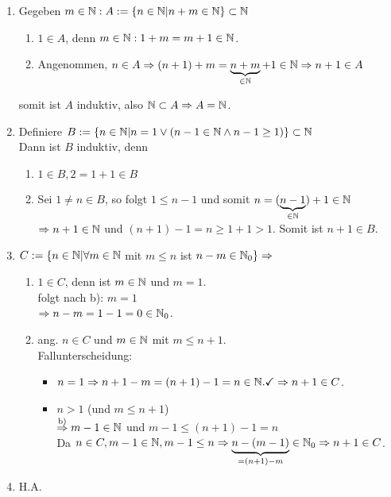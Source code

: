 \documentclass[../ana1.tex]{subfiles}
\begin{document}
\begin{bew}\leavevmode
	\begin{enumerate}
		\item Gegeben \(m\in\mathbb{N}: A :=\{n\in \mathbb{N} | n+m\in \mathbb{N} \} \subset \mathbb{N} \) \\
			\begin{enumerate}
				\item \(1\in A\), denn \(m\in\mathbb{N}: 1+m = m+1\in\mathbb{N} \).
				\item Angenommen, \(n\in A \Rightarrow (n+1) + m = \underbrace{n+m}_{\in\mathbb{N}} + 1 \in\mathbb{N} \\
					\Rightarrow n+1\in A\)
			\end{enumerate} somit ist \(A\) induktiv, also \( \mathbb{N}\subset A \Rightarrow A = \mathbb{N} \).
		\item Definiere \(B:= \{n\in \mathbb{N} |n=1 \vee (n-1\in\mathbb{N}\wedge n-1\geq 1)\} \subset \mathbb{N} \) \\
			Dann ist \(B\) induktiv, denn
			\begin{enumerate}
				\item \(1\in B, 2=1+1\in B\)
				\item Sei \(1\neq n\in B\), so folgt \(1\leq n-1\) und somit \(n=(\underbrace{n-1}_{\in\mathbb{N}}) +1\in\mathbb{N} \) \\
					\( \Rightarrow n+1\in\mathbb{N} \) und \((n+1)-1=n\geq 1+1>1\).
					Somit ist \(n+1\in B\).
			\end{enumerate}
		\item \(C:= \{n\in \mathbb{N} | \forall m \in \mathbb{N} \) mit \(m\leq n\) ist \(n-m\in \mathbb{N}_0\}\Rightarrow \)
			\begin{enumerate}
				\item \(1\in C\), denn ist \(m\in \mathbb{N} \) und \(m=1\).\\
					folgt nach b): \(m=1\) \\
					\(\Rightarrow n - m = 1 - 1 = 0\in \mathbb{N}_0\).
				\item ang. \(n\in C\) und \(m\in\mathbb{N} \) mit \(m\leq n+1\).\\
					Fallunterscheidung:
					\begin{itemize}
						\item \(n=1 \Rightarrow n+1-m=(n+1)-1=n\in\mathbb{N}.\checkmark \\
							\Rightarrow n+1\in C\).
						\item \(n > 1\) (und \(m \leq n+1\))\\
							\(\overset{\text{b)}}{\Rightarrow} m-1\in \mathbb{N} \) und \(m-1 \leq (n+1)-1 = n\) \\
							Da \(n\in C, m-1\in\mathbb{N}, m-1\leq n \Rightarrow \underbrace{n-(m-1)}_{=(n+1)-m} \in \mathbb{N}_0\\
							\Rightarrow n+1\in C\).
					\end{itemize}
			\end{enumerate}
		\item H.A.
	\end{enumerate}
\end{bew}
\end{document}
